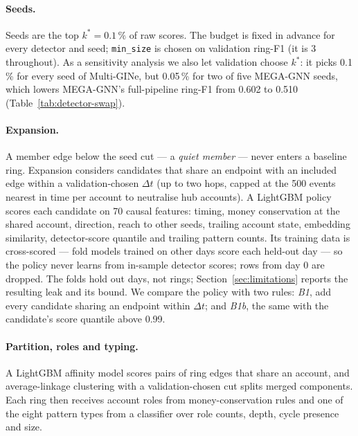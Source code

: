 \paragraph{Seeds.}
Seeds are the top $k^{*}=0.1\,\%$ of raw scores. The budget is fixed in advance for every detector
and seed; \texttt{min\_size} is chosen on validation ring-F1 (it is 3 throughout). As a sensitivity
analysis we also let validation choose $k^{*}$: it picks 0.1\,\% for every seed of Multi-GINe, but
0.05\,\% for two of five MEGA-GNN seeds, which lowers MEGA-GNN's full-pipeline ring-F1 from 0.602 to
0.510 (Table~\ref{tab:detector-swap}).

\paragraph{Expansion.}
A member edge below the seed cut --- a \emph{quiet member} --- never enters a baseline ring.
Expansion considers candidates that share an endpoint with an included edge within a
validation-chosen $\Delta t$ (up to two hops, capped at the 500 events nearest in time per
account to neutralise hub accounts).
A LightGBM policy~\citep{ke2017} scores each candidate on 70 causal features: timing, money
conservation at the shared account, direction, reach to other seeds, trailing account state,
embedding similarity, detector-score quantile and trailing pattern counts.
Its training data is cross-scored --- fold models trained on other days score each held-out
day --- so the policy never learns from in-sample detector scores; rows from day 0 are
dropped.
The folds hold out days, not rings; Section~\ref{sec:limitations} reports the resulting leak
and its bound. We compare the policy with two rules: \emph{B1}, add every candidate sharing an
endpoint within $\Delta t$; and \emph{B1b}, the same with the candidate's score quantile above
0.99.

\paragraph{Partition, roles and typing.}
A LightGBM affinity model scores pairs of ring edges that share an account, and
average-linkage clustering with a validation-chosen cut splits merged components. Each ring
then receives account roles from money-conservation rules and one of the eight pattern types
from a classifier over role counts, depth, cycle presence and size.

